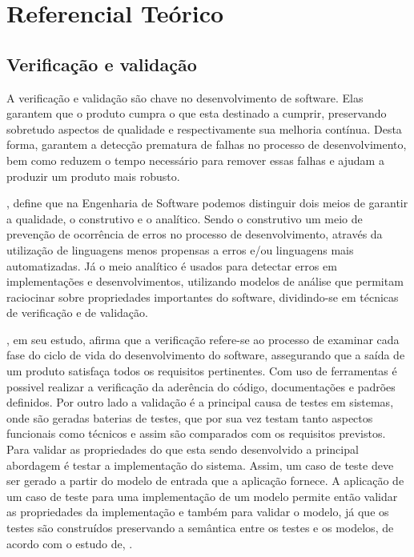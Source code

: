 \chapter[Referencial]{Referencial Teórico}

\section{Verificação e validação}
A verificação e validação são chave no desenvolvimento de software.
Elas garantem que o produto cumpra o que esta destinado a cumprir,
preservando sobretudo aspectos de qualidade e respectivamente sua melhoria contínua.
Desta forma, garantem a detecção prematura de falhas no processo de desenvolvimento,
bem como reduzem o tempo necessário para remover essas falhas e ajudam a produzir um
produto mais robusto.

 \cite{gregor}, define que na Engenharia de Software podemos distinguir dois meios de garantir a qualidade,
o construtivo e o analítico. Sendo o construtivo um meio de prevenção de ocorrência de
erros no processo de desenvolvimento, através da utilização de linguagens menos
propensas a erros e/ou linguagens mais automatizadas.
Já o meio analítico é usados para detectar erros em implementações e desenvolvimentos,
 utilizando modelos de análise que permitam raciocinar sobre propriedades importantes
 do software, dividindo-se em técnicas de verificação e de validação.

 \cite{lorea}, em seu estudo, afirma que a verificação refere-se ao processo de examinar cada fase do ciclo de vida do
desenvolvimento do software, assegurando que a saída de um produto satisfaça
todos os requisitos pertinentes. Com uso de ferramentas é possivel realizar a verificação
da aderência do código, documentações e padrões definidos.
Por outro lado a validação é a principal causa de testes em sistemas,
onde são geradas baterias de testes, que por sua vez testam tanto aspectos
funcionais como técnicos e assim são comparados com os requisitos previstos.
Para validar as propriedades do que esta sendo desenvolvido a principal abordagem
é testar a implementação do sistema. Assim, um caso de teste deve ser gerado a partir
do modelo de entrada que a aplicação fornece. A aplicação de um caso de teste para uma
implementação de um modelo permite então validar as propriedades da implementação
e também para validar o modelo, já que os testes são construídos  preservando a
semântica entre os testes e os modelos, de acordo com o estudo de, \cite{gregor}.

